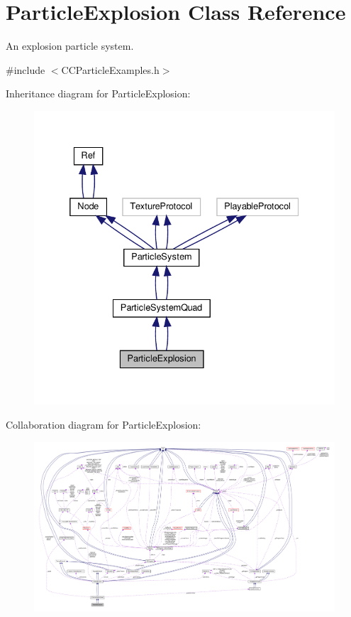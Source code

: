 \hypertarget{classParticleExplosion}{}\section{Particle\+Explosion Class Reference}
\label{classParticleExplosion}


An explosion particle system.  




{\ttfamily \#include $<$C\+C\+Particle\+Examples.\+h$>$}



Inheritance diagram for Particle\+Explosion\+:
\nopagebreak
\begin{figure}[H]
\begin{center}
\leavevmode
\includegraphics[width=332pt]{classParticleExplosion__inherit__graph}
\end{center}
\end{figure}


Collaboration diagram for Particle\+Explosion\+:
\nopagebreak
\begin{figure}[H]
\begin{center}
\leavevmode
\includegraphics[width=350pt]{classParticleExplosion__coll__graph}
\end{center}
\end{figure}
